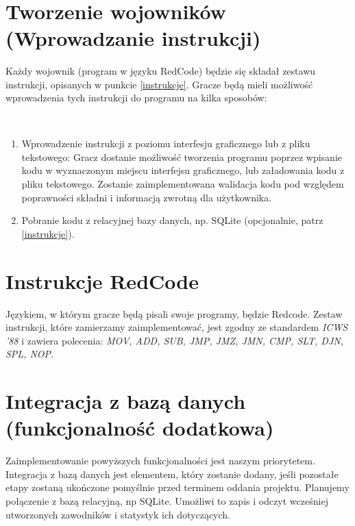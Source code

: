 \

\section{Tworzenie wojowników (Wprowadzanie instrukcji)}
Każdy wojownik (program w języku RedCode) będzie się składał zestawu instrukcji, opisanych w punkcie \ref{instrukcje}. Gracze będą mieli możliwość wprowadzenia tych instrukcji do programu na kilka sposobów:

\
\begin{enumerate}
	\item Wprowadzenie instrukcji z poziomu interfesju graficznego lub z pliku tekstowego:
	\newline
		Gracz dostanie możliwość tworzenia programu poprzez wpisanie kodu w wyznaczonym miejscu interfejsu graficznego, lub załadowania kodu z pliku tekstowego. Zostanie zaimplementowana walidacja kodu pod względem poprawności składni i informacją zwrotną dla użytkownika.
	
	\item Pobranie kodu z relacyjnej bazy danych, np. SQLite (opcjonalnie, patrz \ref{instrukcje}).
\end{enumerate}

\section{Instrukcje RedCode}
Językiem, w którym gracze będą pisali swoje programy, będzie Redcode. Zestaw instrukcji, które zamierzamy zaimplementować, jest zgodny ze standardem \textit{ICWS '88} i zawiera polecenia: \textit{MOV, ADD, SUB, JMP, JMZ, JMN, CMP, SLT, DJN, SPL, NOP}.
\label{instrukcje}

\section{Integracja z bazą danych (funkcjonalność dodatkowa)}

Zaimplementowanie powyższych funkcjonalności jest naszym priorytetem. Integracja z bazą danych jest elementem, który zostanie dodany, jeśli pozostałe etapy zostaną ukończone pomyślnie przed terminem oddania projektu. Planujemy połączenie z bazą relacyjną, np SQLite. Umożliwi to zapis i odczyt wcześniej utworzonych zawodników i statystyk ich dotyczących.

\label{database}
